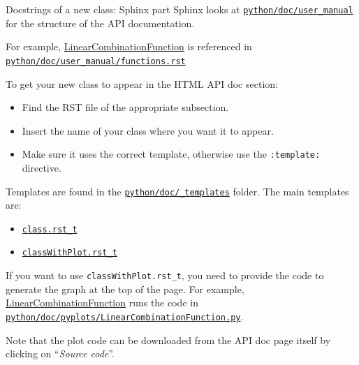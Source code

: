 \documentclass[8pt, handout]{beamer}
\begin{document}
\begin{frame}{Docstrings of a new class: Sphinx part}
Sphinx looks at \href{https://github.com/openturns/openturns/tree/master/python/doc/user_manual}{\texttt{python/\alert{doc}/user\_manual}} for the structure of the API documentation.

For example, \href{https://openturns.github.io/openturns/master/user_manual/_generated/openturns.LinearCombinationFunction.html}{\alert{LinearCombinationFunction}} is referenced in \href{https://github.com/openturns/openturns/blob/master/python/doc/user_manual/functions.rst}{\texttt{python/doc/user\_manual/functions.rst}}

To get your new class to appear in the \alert{HTML API doc} section:

\begin{itemize}
    \item Find the \alert{RST file} of the appropriate subsection.
    \item \alert{Insert the name} of your class where you want it to appear.
    \item Make sure it uses the correct \alert{template}, otherwise use the \texttt{:template:} directive.
\end{itemize}

Templates are found in the \href{https://github.com/openturns/openturns/tree/master/python/doc/_templates}{\texttt{python/doc/\_templates}} folder. The main templates are:

\begin{itemize}
    \item \href{https://github.com/openturns/openturns/blob/master/python/doc/_templates/class.rst_t}{\alert{\texttt{class.rst\_t}}}
    \item \href{https://github.com/openturns/openturns/blob/master/python/doc/_templates/classWithPlot.rst_t}{\alert{\texttt{classWithPlot.rst\_t}}}
\end{itemize}

If you want to use \texttt{classWithPlot.rst\_t}, you need to provide the code to generate the graph at the top of the page. For example, \href{https://openturns.github.io/openturns/master/user_manual/_generated/openturns.LinearCombinationFunction.html}{\alert{LinearCombinationFunction}} runs the code in
\href{https://github.com/openturns/openturns/blob/master/python/doc/pyplots/LinearCombinationFunction.py}{\texttt{\alert{python/doc/pyplots}/LinearCombinationFunction.py}}.

Note that the plot code can be downloaded from the API doc page itself by clicking on ``\emph{Source code}''.
\end{frame}
\end{document}
